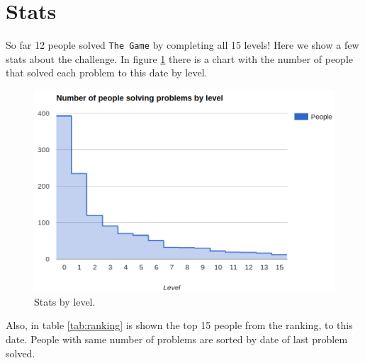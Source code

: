 \documentclass[paper=a4, fontsize=11pt]{scrartcl}	%
\begin{document}
\clearpage
\section{Stats}
So far 12 people solved \texttt{The Game} by completing all 15 levels! Here we show a few stats about the challenge. In figure \ref{fig:stats} there is a chart with the number of people that solved each problem to this date by level.

\begin{figure}[ht]
\centering
\includegraphics[width=\textwidth]{images/stats.png}
\caption{Stats by level.}
\label{fig:stats}
\end{figure}

Also, in table \ref{tab:ranking} is shown the top 15 people from the ranking, to this date. People with same number of problems are sorted by date of last problem solved.
\end{document}
